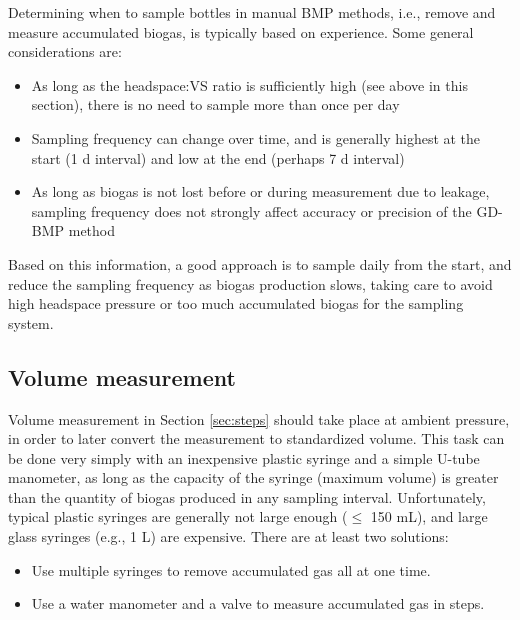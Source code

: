 \documentclass[]{article}
\begin{document}
Determining when to sample bottles in manual BMP methods, i.e., remove and measure accumulated biogas, is typically based on experience. 
Some general considerations are:
\begin{itemize}
  \item As long as the headspace:VS ratio is sufficiently high (see above in this section), there is no need to sample more than once per day
  \item Sampling frequency can change over time, and is generally highest at the start (1 d interval) and low at the end (perhaps 7 d interval)
  \item As long as biogas is not lost before or during measurement due to leakage, sampling frequency does not strongly affect accuracy or precision of the GD-BMP method
\end{itemize}

Based on this information, a good approach is to sample daily from the start, and reduce the sampling frequency as biogas production slows, taking care to avoid high headspace pressure or too much accumulated biogas for the sampling system.

\subsection{Volume measurement}
\label{sec:volmeas}
Volume measurement in Section \ref{sec:steps} should take place at ambient pressure, in order to later convert the measurement to standardized volume.
This task can be done very simply with an inexpensive plastic syringe and a simple U-tube manometer, as long as the capacity of the syringe (maximum volume) is greater than the quantity of biogas produced in any sampling interval.
Unfortunately, typical plastic syringes are generally not large enough ($\le$ 150 mL), and large glass syringes (e.g., 1 L) are expensive.
There are at least two solutions:
\begin{itemize}
  \item Use multiple syringes to remove accumulated gas all at one time. %
  \item Use a water manometer and a valve to measure accumulated gas in steps. 
\end{itemize}
\end{document}
